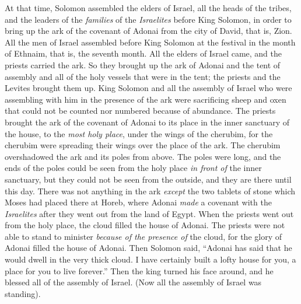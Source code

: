 \begin{biblechapter} %
 At that time, Solomon assembled the elders of Israel, all the heads of the tribes, and the leaders of the \textit{families} of the \textit{Israelites} before King Solomon, in order to bring up the ark of the covenant of Adonai from the city of David, that is, Zion.
\verse All the men of Israel assembled before King Solomon at the festival in the month of Ethnaim, that is, the seventh month.
\verse All the elders of Israel came, and the priests carried the ark.
\verse So they brought up the ark of Adonai and the tent of assembly and all of the holy vessels that were in the tent; the priests and the Levites brought them up.
\verse King Solomon and all the assembly of Israel who were assembling with him in the presence of the ark were sacrificing sheep and oxen that could not be counted nor numbered because of abundance.
\verse The priests brought the ark of the covenant of Adonai to its place in the inner sanctuary of the house, to the \textit{most holy place}, under the wings of the cherubim,
\verse for the cherubim were spreading their wings over the place of the ark. The cherubim overshadowed the ark and its poles from above.
\verse The poles were long, and the ends of the poles could be seen from the holy place \textit{in front of} the inner sanctuary, but they could not be seen from the outside, and they are there until this day.
\verse There was not anything in the ark \textit{except} the two tablets of stone which Moses had placed there at Horeb, where Adonai \textit{made} a covenant with the \textit{Israelites} after they went out from the land of Egypt.
\verse When the priests went out from the holy place, the cloud filled the house of Adonai.
\verse The priests were not able to stand to minister \textit{because of the presence of} the cloud, for the glory of Adonai filled the house of Adonai.
 Then Solomon said, “Adonai has said that he would dwell in the very thick cloud.
\verse I have certainly built a lofty house for you, a place for you to live forever.”
\verse Then the king turned his face around, and he blessed all of the assembly of Israel. (Now all the assembly of Israel was standing).

\end{biblechapter}
